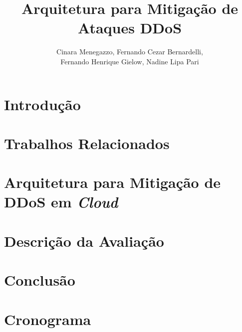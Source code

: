 \documentclass[a4paper, 12pt]{article}
\begin{document}
\title{Arquitetura para Mitigação de Ataques DDoS}

\author{
Cinara Menegazzo,
Fernando Cezar Bernardelli, \\
Fernando Henrique Gielow,
Nadine Lipa Pari
}
   

   
\address{Departamento de Informática -- Universidade Federal do Paraná\\
NR2 - Núcleo de Redes Sem Fio e Redes Avançadas\\
  Caixa Postal 19.081 -- 81.531-980 -- Curitiba -- PR -- Brasil
}     

\maketitle


\begin{resumo}

\end{resumo}



\section{Introdução}



\section{Trabalhos Relacionados}

 



\section{Arquitetura para Mitigação de DDoS em \emph{Cloud}}





\section{Descrição da Avaliação}


\section{Conclusão}



\section{Cronograma}



% 



\end{document}
